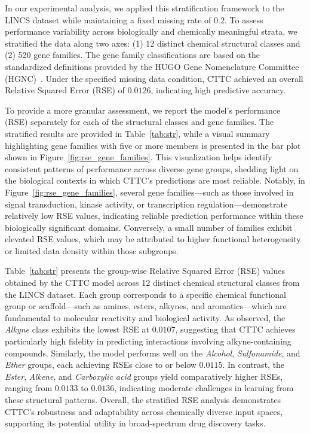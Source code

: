 \documentclass{article}
\begin{document}
In our experimental analysis, we applied this stratification framework to the LINCS dataset while maintaining a fixed missing rate of \(0.2\). To assess performance variability across biologically and chemically meaningful strata, we stratified the data along two axes: (1) 12 distinct chemical structural classes and (2) 520 gene families. The gene family classifications are based on the standardized definitions provided by the HUGO Gene Nomenclature Committee (HGNC)~\cite{hgnc2022gene}. Under the specified missing data condition, CTTC achieved an overall Relative Squared Error  (RSE) of \(0.0126\), indicating high predictive accuracy.

To provide a more granular assessment, we report the model’s performance (RSE) separately for each of the structural classes and gene families. The stratified results are provided in Table~\ref{tab:str}, while a visual summary highlighting gene families with five or more members is presented in the bar plot shown in Figure~\ref{fig:rse_gene_families}. This visualization helps identify consistent patterns of performance across diverse gene groups, shedding light on the biological contexts in which CTTC’s predictions are most reliable. Notably, in Figure~\ref{fig:rse_gene_families}, several gene families—such as those involved in signal transduction, kinase activity, or transcription regulation—demonstrate relatively low RSE values, indicating reliable prediction performance within these biologically significant domains. Conversely, a small number of families exhibit elevated RSE values, which may be attributed to higher functional heterogeneity or limited data density within those subgroups.



Table~\ref{tab:str} presents the group-wise Relative Squared Error (RSE) values obtained by the CTTC model across 12 distinct chemical structural classes from the LINCS dataset. Each group corresponds to a specific chemical functional group or scaffold—such as amines, esters, alkynes, and aromatics—which are fundamental to molecular reactivity and biological activity. As observed, the \textit{Alkyne} class exhibits the lowest RSE at $0.0107$, suggesting that CTTC achieves particularly high fidelity in predicting interactions involving alkyne-containing compounds. Similarly, the model performs well on the \textit{Alcohol}, \textit{Sulfonamide}, and \textit{Ether} groups, each achieving RSEs close to or below $0.0115$. In contrast, the \textit{Ester}, \textit{Alkene}, and \textit{Carboxylic acid} groups yield comparatively higher RSEs, ranging from $0.0133$ to $0.0136$, indicating moderate challenges in learning from these structural patterns. Overall, the stratified RSE analysis demonstrates CTTC’s robustness and adaptability across chemically diverse input spaces, supporting its potential utility in broad-spectrum drug discovery tasks.
\end{document}
